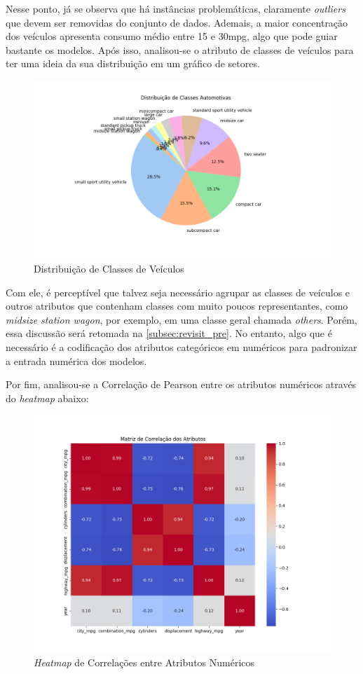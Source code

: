 \documentclass{report}
\begin{document}
Nesse ponto, já se observa que há instâncias problemáticas, claramente \textit{outliers} que devem ser removidas do conjunto de dados. Ademais, a maior concentração dos veículos
apresenta consumo médio entre 15 e 30mpg, algo que pode guiar bastante os modelos. Após isso, analisou-se o atributo de classes de veículos para ter uma ideia da sua distribuição
em um gráfico de setores.

\begin{figure}[h!]
  \centering
  \includegraphics[width=.85\linewidth]{images/plots/pie_charts/pure_car_classes.png}
  \caption{\label{img:classes_dist} Distribuição de Classes de Veículos}
\end{figure}

Com ele, é perceptível que talvez seja necessário agrupar as classes de veículos e outros atributos que contenham classes com muito poucos representantes, como \textit{midsize station wagon},
por exemplo, em uma classe geral chamada \textit{others}. Porém, essa discussão será retomada na \autoref{subsec:revisit_pre}. No entanto, algo que é necessário é a codificação dos
atributos categóricos em numéricos para padronizar a entrada numérica dos modelos.

Por fim, analisou-se a Correlação de Pearson entre os atributos numéricos através do \textit{heatmap} abaixo:

\begin{figure}[h!]
  \centering
  \includegraphics[width=.85\linewidth]{images/plots/heatmaps/numeric_atributes_correlation.png}
  \caption{\label{img:num_heatmat} \textit{Heatmap} de Correlações entre Atributos Numéricos}
\end{figure}
\end{document}
